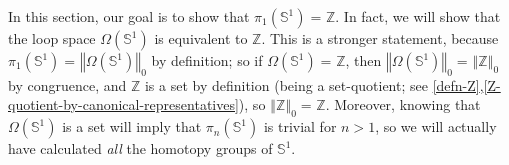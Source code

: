 \documentclass[12pt]{article}
\newcommand{\id}[3][]{\ensuremath{#2 =_{#1} #3}\xspace}
\newcommand{\Sn}{\mathbb{S}}
\newcommand{\trunc}[2]{\mathopen{}\left\Vert #2\right\Vert_{#1}\mathclose{}}
\newcommand{\Z}{\ensuremath{\mathbb{Z}}\xspace}
\let\autoref\cref
\begin{document}
In this section, our goal is to show that $\id {\pi_1(\Sn ^1)} {\Z}$.
In fact, we will show that the loop space ${\Omega(\Sn ^1)}$ is equivalent to $\Z$.
This is a stronger statement, because $\id{\pi_1(\Sn ^1)} {\trunc 0 {\Omega(\Sn ^1)}}$ by
definition; so if $\id {\Omega(\Sn ^1)} {\Z}$, then $\id {\trunc
  0 {\Omega(\Sn ^1)}} {\trunc 0 {\Z}}$ by congruence, and
$\Z$ is a set by definition (being a set-quotient; see \autoref{defn-Z},\autoref{Z-quotient-by-canonical-representatives}), so $\id {\trunc 0 {\Z}} {\Z}$.
Moreover, knowing that ${\Omega(\Sn ^1)}$ is a set will imply that $\pi_n(\Sn^1)$ is trivial for $n>1$, so we will actually have calculated \emph{all} the homotopy groups of $\Sn^1$.
\end{document}
